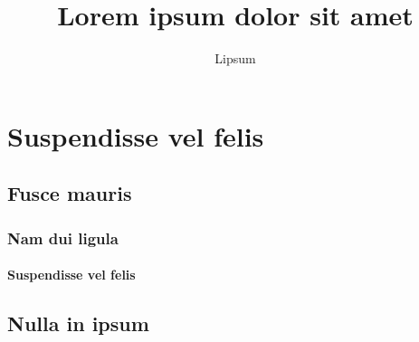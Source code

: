 \documentclass{scrreprt}
\author{Lipsum}
\title{Lorem ipsum dolor sit amet}
\begin{document}

\maketitle

\begin{abstract}
\lipsum[23]
\end{abstract}

\chapter{Suspendisse vel felis}
\lipsum[42]
\section{Fusce mauris}
\lipsum[6]
\lipsum[7]

\subsection{Nam dui ligula}
\lipsum[56]
\lipsum[57]
\lipsum[58]

\subsubsection{Suspendisse vel felis}
\lipsum[12]
\lipsum[13]

\section{Nulla in ipsum}
\lipsum[14]
\lipsum[15]
\end{document}
